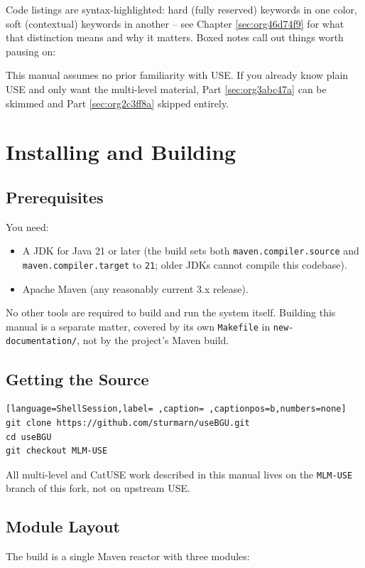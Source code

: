 \documentclass[11pt,twoside,a4paper]{book}
\begin{document}
Code listings are syntax-highlighted: hard (fully reserved) keywords
in one color, soft (contextual) keywords in another -- see Chapter
\ref{sec:org46d74f9} for what that distinction means and why it
matters. Boxed notes call out things worth pausing on:

\begin{manualnote}
This manual assumes no prior familiarity with USE. If you already know
plain USE and only want the multi-level material, Part
\ref{sec:org3abc47a} can be skimmed and Part \ref{sec:org2c3ff8a}
skipped entirely.
\end{manualnote}
\chapter{Installing and Building}
\label{sec:orgf97e73e}
\section{Prerequisites}
\label{sec:org3029462}

You need:

\begin{itemize}
\item A JDK for Java 21 or later (the build sets both
\texttt{maven.compiler.source} and \texttt{maven.compiler.target} to \texttt{21}; older
JDKs cannot compile this codebase).
\item Apache Maven (any reasonably current 3.x release).
\end{itemize}

No other tools are required to build and run the system itself.
Building this manual is a separate matter, covered by its own
\texttt{Makefile} in \texttt{new-documentation/}, not by the project's Maven build.

\section{Getting the Source}
\label{sec:org155dd77}
\begin{lstlisting}[language=ShellSession,label= ,caption= ,captionpos=b,numbers=none]
git clone https://github.com/sturmarn/useBGU.git
cd useBGU
git checkout MLM-USE
\end{lstlisting}

All multi-level and CatUSE work described in this manual lives on the
\texttt{MLM-USE} branch of this fork, not on upstream USE.

\section{Module Layout}
\label{sec:org7c8eff9}
The build is a single Maven reactor with three modules:
\end{document}
